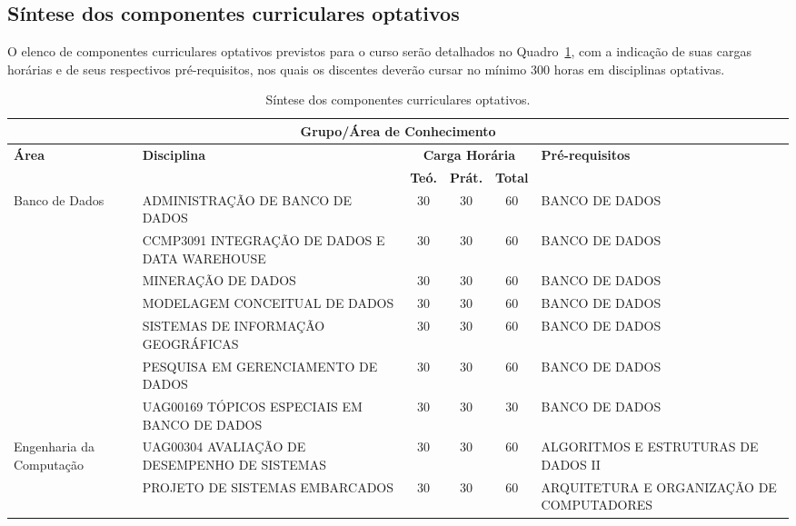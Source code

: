 \documentclass[
	12pt,				%
	openright,			%
  oneside,     %
	a4paper,			%
	chapter=TITLE,		%
	english,			%
	french,				%
	spanish,			%
	brazil				%
	]{abntex2}
\begin{document}
  \subsection{Síntese dos componentes curriculares optativos}
  
  O elenco de componentes curriculares optativos previstos para o curso serão detalhados no Quadro~\ref{quadro:sintese-componentes-curriculares-optativos}, com a indicação de suas cargas horárias e de seus respectivos pré-requisitos, nos quais os discentes deverão cursar no mínimo 300 horas em disciplinas optativas.
  
  \begin{center}
    
    \begin{tiny}
      \begin{longtable}{p{2.5cm}p{5.5cm}cccp{3.3cm}}
        \caption{\label{quadro:sintese-componentes-curriculares-optativos}Síntese dos componentes curriculares optativos.}\\
      \toprule
      \multicolumn{6}{c}{\textbf{Grupo/Área de Conhecimento}} \\ \midrule
      \textbf{Área} & \textbf{Disciplina} & \multicolumn{3}{c}{\textbf{Carga Horária}} & \textbf{Pré-requisitos} \\
      & & \textbf{Teó.} & \textbf{Prát.} & \textbf{Total} & \\
      \midrule
    Banco de Dados & ADMINISTRAÇÃO DE BANCO DE DADOS & 30 & 30 & 60 & BANCO DE DADOS \\ \cline{2-6}
      & CCMP3091 INTEGRAÇÃO DE DADOS E DATA WAREHOUSE & 30 & 30 & 60 & BANCO DE DADOS \\ \cline{2-6}
      & MINERAÇÃO DE DADOS & 30 & 30 & 60 & BANCO DE DADOS \\ \cline{2-6}
      & MODELAGEM CONCEITUAL DE DADOS & 30 & 30 & 60 & BANCO DE DADOS \\ \cline{2-6}
      & SISTEMAS DE INFORMAÇÃO GEOGRÁFICAS & 30 & 30 & 60 & BANCO DE DADOS \\ \cline{2-6}
      & PESQUISA EM GERENCIAMENTO DE DADOS & 30 & 30 & 60 & BANCO DE DADOS \\ \cline{2-6}
      & UAG00169 TÓPICOS ESPECIAIS EM BANCO DE DADOS & 30 & 30 & 30 & BANCO DE DADOS \\ \midrule
    Engenharia da Computação & UAG00304 AVALIAÇÃO DE DESEMPENHO DE SISTEMAS & 30 & 30 & 60 & ALGORITMOS E ESTRUTURAS DE DADOS II \\ \cline{2-6}
      & PROJETO DE SISTEMAS EMBARCADOS & 30 & 30 & 60 & ARQUITETURA E ORGANIZAÇÃO DE COMPUTADORES \\ \cline{2-6}

\end{longtable}
\end{tiny}
\end{center}
\end{document}
